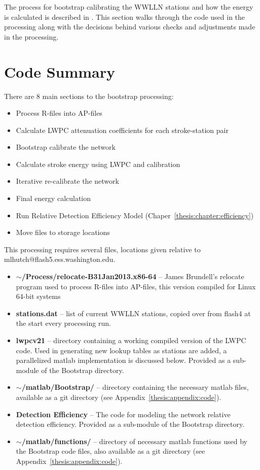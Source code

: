 The process for bootstrap calibrating the WWLLN stations and how the energy is calculated is described in \citet{Hutchins2012}.
This section walks through the code used in the processing along with the decisions behind various checks and adjustments made in the processing.

\section{Code Summary}

There are 8 main sections to the bootstrap processing:

\begin{itemize}
	\item{Process R-files into AP-files}
	\item{Calculate LWPC attenuation coefficients for each stroke-station pair}
	\item{Bootstrap calibrate the network}
	\item{Calculate stroke energy using LWPC and calibration}
	\item{Iterative re-calibrate the network}
	\item{Final energy calculation}
	\item{Run Relative Detection Efficiency Model (Chaper~\ref{thesis:chapter:efficiency})}
	\item{Move files to storage locations}
\end{itemize}

This processing requires several files, locations given relative to mlhutch@flash5.ess.washington.edu.

\begin{itemize}
	\item{\textbf{$\sim$/Process/relocate-B31Jan2013.x86-64} -- James Brundell's relocate program used to process R-files into AP-files, this version compiled for Linux 64-bit systems}
	\item{\textbf{stations.dat} -- list of current WWLLN stations, copied over from flash4 at the start every processing run.}
	\item{\textbf{lwpcv21} -- directory containing a working compiled version of the LWPC code.
		Used in generating new lookup tables as stations are added, a parallelized matlab implementation is discussed below.
		Provided as a sub-module of the Bootstrap directory.}
	\item{\textbf{$\sim$/matlab/Bootstrap/} -- directory containing the necessary matlab files, available as a git directory (see Appendix~\ref{thesis:appendix:code}).}
	\item{\textbf{Detection Efficiency} -- The code for modeling the network relative detection efficiency.
		Provided as a sub-module of the Bootstrap directory.}
	\item{\textbf{$\sim$/matlab/functions/} -- directory of necessary matlab functions used by the Bootstrap code files, also available as a git directory (see Appendix~\ref{thesis:appendix:code}).}
\end{itemize}

